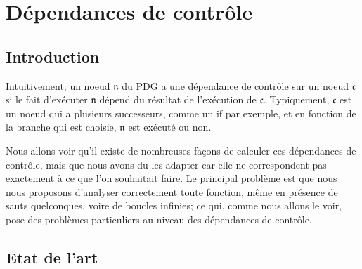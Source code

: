 \newcommand{\text}[1]{\mbox{#1}}
\newcommand{\impl}{\Rightarrow}
\newcommand{\et}{\wedge}
\newcommand{\ou}{\vee}
\newcommand{\define}{\Leftrightarrow{def}}
\newcommand{\mssi}{\Leftrightarrow}

\newcommand{\llb}{\llbracket}
\newcommand{\ch}[1]{[#1]}
\newcommand{\mch}[1]{[#1[}
\newcommand{\allch}[1]{\llb #1] }
\newcommand{\allmch}[1]{\llb #1[}

\newcommand{\n}[1]{\ensuremath{\mathfrak{#1}}}
\newcommand{\nE}{\n{E}}
\renewcommand{\P}[1]{\ensuremath{\mathit{P}(\n{#1})}}
\newcommand{\D}[2]{\ensuremath{\mathit{D}(\n{#1},\n{#2})}}
\newcommand{\Pd}[1]{\ensuremath{\mathit{Pd}(\n{#1})}}
\newcommand{\Pdi}[1]{\ensuremath{\mathit{Pd}^{\infty}(\n{#1})}}
\newcommand{\Pda}[1]{\ensuremath{\mathit{Pd}^{+}(\n{#1})}}
\newcommand{\dpdc}[1]{\ensuremath{\mathit{DpdC}(\n{#1})}}
\newcommand{\codpdc}[1]{\ensuremath{\mathit{CoDpdC}(\n{#1})}}
\renewcommand{\succ}[1]{\ensuremath{\mathit{Succ}(\n{#1})}}
\newcommand{\succl}[1]{\ensuremath{\mathit{Succ_{L}}(\n{#1})}}

\newcommand{\ssi}{si et seulement si }

\chapter{Dépendances de contrôle}\label{sec-cdg}

\section{Introduction}

Intuitivement, un noeud \n{n} du PDG a une dépendance de contrôle sur un noeud
\n{c}
si le fait d'exécuter \n{n} dépend du résultat de l'exécution de \n{c}.
Typiquement, \n{c} est un noeud qui a plusieurs successeurs, comme un {\sc if} par
exemple,
et en fonction de la branche qui est choisie, \n{n} est exécuté ou non.

Nous allons voir qu'il existe de nombreuses façons de calculer ces
dépendances de contrôle, mais que nous avons du les adapter car
elle ne correspondent pas exactement à ce que l'on souhaitait faire.
Le principal problème est que
nous nous proposons d'analyser correctement
toute fonction, même en présence de sauts quelconques, voire de boucles
infinies; ce qui, comme nous allons le voir,
pose des problèmes particuliers au niveau des dépendances de contrôle.

\section{Etat de l'art}

